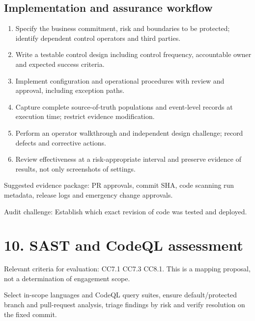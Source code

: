\documentclass[10pt,oneside]{report}
\begin{document}
\subsection{Implementation and assurance workflow}
\begin{enumerate}
\item Specify the business commitment, risk and boundaries to be protected; identify dependent control operators and third parties.
\item Write a testable control design including control frequency, accountable owner and expected success criteria.
\item Implement configuration and operational procedures with review and approval, including exception paths.
\item Capture complete source-of-truth populations and event-level records at execution time; restrict evidence modification.
\item Perform an operator walkthrough and independent design challenge; record defects and corrective actions.
\item Review effectiveness at a risk-appropriate interval and preserve evidence of results, not only screenshots of settings.
\end{enumerate}

Suggested evidence package: PR approvals, commit SHA, code scanning run metadata, release logs and emergency change approvals.

Audit challenge: Establish which exact revision of code was tested and deployed.

\section{10. SAST and CodeQL assessment}
Relevant criteria for evaluation: CC7.1 CC7.3 CC8.1. This is a mapping proposal, not a determination of engagement scope.

\begin{engineeringbox}
Select in-scope languages and CodeQL query suites, ensure default/protected branch and pull-request analysis, triage findings by risk and verify resolution on the fixed commit.
\end{engineeringbox}
\end{document}
